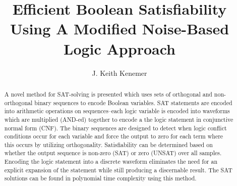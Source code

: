 \documentclass[reqno]{amsart}
\theoremstyle{definition}
\theoremstyle{remark}
\begin{document}

\title{Efficient Boolean Satisfiability Using A Modified Noise-Based Logic Approach }

\author{J. Keith Kenemer}






\begin{abstract}
A novel method for SAT-solving is presented which uses sets of orthogonal and non-orthogonal binary sequences to encode Boolean variables. SAT statements are encoded into arithmetic operations on sequences--each logic variable is encoded into waveforms which are multiplied (AND-ed) together to encode a the logic statement in conjunctive normal form (CNF).  The binary sequences are designed to detect when logic conflict conditions occur for each variable and force the output to zero for each term where this occurs by utilizing orthogonality. Satisfiability can be determined based on whether the output sequence is non-zero (SAT) or zero (UNSAT) over all samples. Encoding the logic statement into a discrete waveform eliminates the need for an explicit expansion of the statement while still producing a discernable result. The SAT solutions can be found in polynomial time complexity using this method.

\end{abstract}

\end{document}

